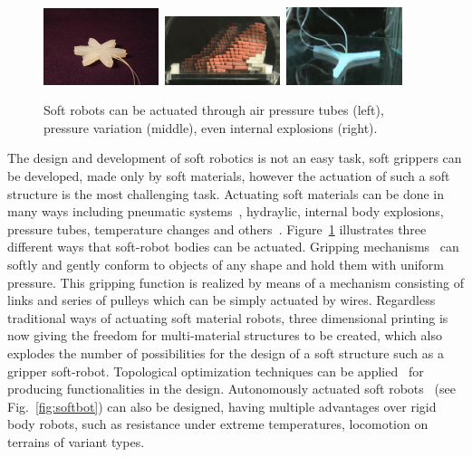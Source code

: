 \begin{figure}[t!]
\centering
\includegraphics[width=0.3\textwidth,height=0.13\textheight]{../Figures/Misc/soft_robotics_figure.png}\		
\includegraphics[width=0.3\textwidth,height=0.13\textheight]{../Figures/Misc/hillerPressureChamber.png}\	
\includegraphics[width=0.3\textwidth,height=0.13\textheight]{../Figures/Misc/ExplodingRobot.jpg}\\
\caption{Soft robots can be actuated through air pressure tubes (left), pressure variation (middle), even internal explosions (right).}
\label{fig:softRobotsActuation}
\end{figure}

The design and development of soft robotics is not an easy task, soft grippers can be developed, made only by soft materials, however the actuation of such a soft structure is the most challenging task. Actuating soft materials can be done in many ways including pneumatic systems~\citep{ilievski2011soft, shepherd2011multigait}, hydraylic, internal body explosions, pressure tubes, temperature changes and others~\citep{laschi2012soft, seok2010peristaltic}. Figure~\ref{fig:softRobotsActuation} illustrates three different ways that soft-robot bodies can be actuated. Gripping mechanisms~\citep{hirose1978development} can softly and gently conform to objects of any shape and hold them with uniform pressure. This gripping function is realized by means of a mechanism consisting of links and series of pulleys which can be simply actuated by wires. Regardless traditional ways of actuating soft material robots, three dimensional printing is now giving the freedom for multi-material structures to be created, which also explodes the number of possibilities for the design of a soft structure such as a gripper soft-robot. Topological optimization techniques can be applied~\citep{hiller2009multi} for producing functionalities in the design. Autonomously actuated soft robots~\citep{tolleyresilient} (see Fig.~\ref{fig:softbot}) can also be designed, having multiple advantages over rigid body robots, such as resistance under extreme temperatures, locomotion on terrains of variant types. 

